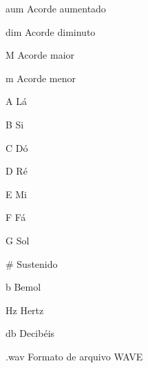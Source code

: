 \begin{siglas}
  \item[aum] Acorde aumentado
  \item[dim] Acorde diminuto
  \item[M] Acorde maior
  \item[m] Acorde menor
  \item[A] Lá
  \item[B] Si
  \item[C] Dó
  \item[D] Ré
  \item[E] Mi
  \item[F] Fá
  \item[G] Sol
  \item[\#] Sustenido
  \item[b] Bemol
  \item[Hz] Hertz
  \item[db] Decibéis
  \item[.wav] Formato de arquivo WAVE
\end{siglas}
